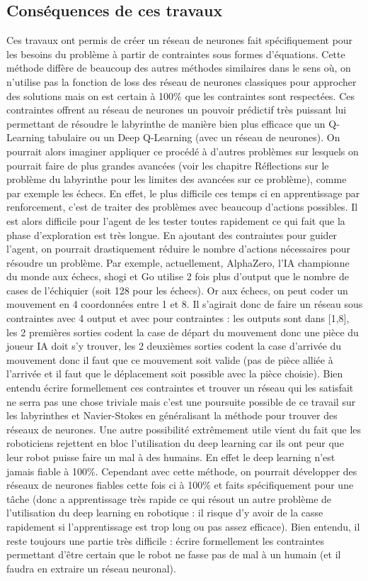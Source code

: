 \documentclass[10pt]{article}
\begin{document}
\subsection{Conséquences de ces travaux}
Ces travaux ont permis de créer un réseau de neurones fait spécifiquement pour les besoins du problème à partir de contraintes sous formes d'équations. Cette méthode diffère de beaucoup des autres méthodes similaires dans le sens où, on n'utilise pas la fonction de loss des réseau de neurones classiques pour approcher des solutions mais on est certain à 100\% que les contraintes sont respectées. Ces contraintes offrent au réseau de neurones un pouvoir prédictif très puissant lui permettant de résoudre le labyrinthe de manière bien plus efficace que un Q-Learning tabulaire ou un Deep Q-Learning (avec un réseau de neurones). On pourrait alors imaginer appliquer ce procédé à d'autres problèmes sur lesquels on pourrait faire de plus grandes avancées (voir les chapitre Réflections sur le problème du labyrinthe pour les limites des avancées sur ce problème), comme par exemple les échecs. En effet, le plus difficile ces temps ci en apprentissage par renforcement, c'est de traiter des problèmes avec beaucoup d'actions possibles. Il est alors difficile pour l'agent de les tester toutes rapidement ce qui fait que la phase d'exploration est très longue. En ajoutant des contraintes pour guider l'agent, on pourrait drastiquement réduire le nombre d'actions nécessaires pour résoudre un problème. Par exemple, actuellement, AlphaZero, l'IA championne du monde aux échecs, shogi et Go utilise 2 fois plus d'output que le nombre de cases de l'échiquier (soit 128 pour les échecs). Or aux échecs, on peut coder un mouvement en 4 coordonnées entre 1 et 8. Il s'agirait donc de faire un réseau sous contraintes avec 4 output et avec pour contraintes : les outputs sont dans [1,8], les 2 premières sorties codent la case de départ du mouvement donc une pièce du joueur IA doit s'y trouver, les 2 deuxièmes sorties codent la case d'arrivée du mouvement donc il faut que ce mouvement soit valide (pas de pièce alliée à l'arrivée et il faut que le déplacement soit possible avec la pièce choisie). Bien entendu écrire formellement ces contraintes et trouver un réseau qui les satisfait ne serra pas une chose triviale mais c'est une poursuite possible de ce travail sur les labyrinthes et Navier-Stokes en généralisant la méthode pour trouver des réseaux de neurones. Une autre possibilité extrêmement utile vient du fait que les roboticiens rejettent en bloc l'utilisation du deep learning car ils ont peur que leur robot puisse faire un mal à des humains. En effet le deep learning n'est jamais fiable à 100\%. Cependant avec cette méthode, on pourrait développer des réseaux de neurones fiables cette fois ci à 100\% et faits spécifiquement pour une tâche (donc a apprentissage très rapide ce qui résout un autre problème de l'utilisation du deep learning en robotique : il risque d'y avoir de la casse rapidement si l'apprentissage est trop long ou pas assez efficace). Bien entendu, il reste toujours une partie très difficile : écrire formellement les contraintes permettant d'être certain que le robot ne fasse pas de mal à un humain (et il faudra en extraire un réseau neuronal).
\end{document}

